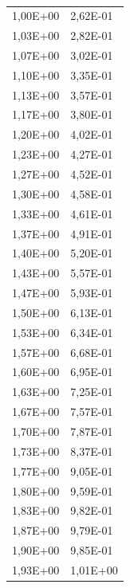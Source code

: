 \documentclass[11p, titlepage, oneside, a4paper]{article}
\begin{document}
\begin{table}
\begin{tabular}{ll}
                1,00E+00 & 2,62E-01 \\
                1,03E+00 & 2,82E-01 \\
                1,07E+00 & 3,02E-01 \\
                1,10E+00 & 3,35E-01 \\
                1,13E+00 & 3,57E-01 \\
                1,17E+00 & 3,80E-01 \\
                1,20E+00 & 4,02E-01 \\
                1,23E+00 & 4,27E-01 \\
                1,27E+00 & 4,52E-01 \\
                1,30E+00 & 4,58E-01 \\
                1,33E+00 & 4,61E-01 \\
                1,37E+00 & 4,91E-01 \\
                1,40E+00 & 5,20E-01 \\
                1,43E+00 & 5,57E-01 \\
                1,47E+00 & 5,93E-01 \\
                1,50E+00 & 6,13E-01 \\
                1,53E+00 & 6,34E-01 \\
                1,57E+00 & 6,68E-01 \\
                1,60E+00 & 6,95E-01 \\
                1,63E+00 & 7,25E-01 \\
                1,67E+00 & 7,57E-01 \\
                1,70E+00 & 7,87E-01 \\
                1,73E+00 & 8,37E-01 \\
                1,77E+00 & 9,05E-01 \\
                1,80E+00 & 9,59E-01 \\
                1,83E+00 & 9,82E-01 \\
                1,87E+00 & 9,79E-01 \\
                1,90E+00 & 9,85E-01 \\
                1,93E+00 & 1,01E+00 \\
                \bottomrule
            \end{tabular}
            \caption{}
            \label{tab:}
        \end{table}



        
\end{document}
